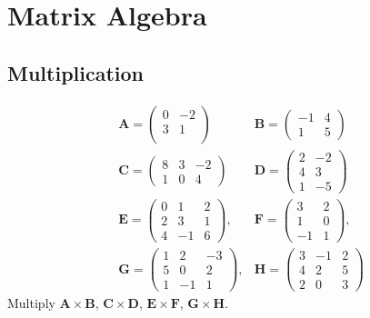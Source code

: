 \documentclass[10pt,a4paper]{article}
\theoremstyle{definition}\newtheorem{definition}{Definition}
\theoremstyle{definition}\newtheorem{fact}{Fact}
\theoremstyle{definition}\newtheorem{remark}{Remark}
\theoremstyle{definition}\newtheorem{ex}{Ex.}
\theoremstyle{definition}\newtheorem{project}{Project}
\theoremstyle{definition}\newtheorem{problem}{Problem}
\theoremstyle{definition}\newtheorem{example}{Example}
\def\E{\mathbb E}
\def\A{\mathbf A}
\def\B{\mathbf B}
\def\C{\mathbf C}
\def\D{\mathbf D}
\def\E{\mathbf E}
\def\F{\mathbf F}
\def\G{\mathbf G}
\def\H{\mathbf H}
\begin{document}
	\section{Matrix Algebra}
	\subsection{Multiplication}
		\begin{align*}
			&\A = \begin{pmatrix}
				0 & -2 \\
				3 & 1 \\
			\end{pmatrix}  & \B = \begin{pmatrix}
				-1 & 4 \\
				1 & 5
			\end{pmatrix} \\
			&\C = \begin{pmatrix}
				8 & 3  & -2 \\
				1 & 0  & 4  
			\end{pmatrix} & \D = \begin{pmatrix}
				2 & -2 \\
				4 & 3 \\
				1 & -5
			\end{pmatrix} \\
			&\E= \begin{pmatrix}
				0 & 1  & 2 \\
				2 & 3  & 1 \\
				4 & -1 & 6 
			\end{pmatrix}, &
			\F = \begin{pmatrix}
				3 & 2  \\
				1 & 0 \\
				-1 & 1
			\end{pmatrix}, \\
			&\G = \begin{pmatrix}
				1 & 2  & -3 \\
				5 & 0  & 2  \\
				1 & -1 & 1  
			\end{pmatrix}, & 
			\H = \begin{pmatrix}
				3 & -1 & 2  \\
				4 & 2  & 5  \\
				2 & 0  & 3  
			\end{pmatrix}
		\end{align*}
	Multiply $\A\times \B$, $\C\times \D$, $\E\times \F$, $\G\times \H$. 
\end{document}
